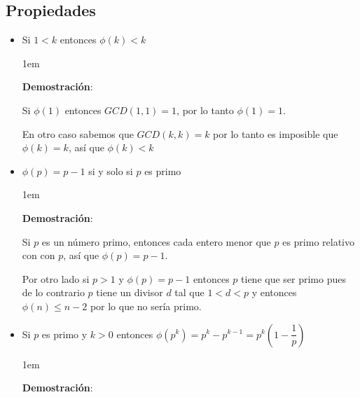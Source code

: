 \documentclass[12pt, fleqn]{report}                             %
\newenvironment{SmallIndentation}[1][0.75em]                    %
    {\begin{adjustwidth}{#1}{}\begin{footnotesize}}                 %
    {\end{footnotesize}\end{adjustwidth}}                           %
\newcommand{\Wrap}[1]{\left( #1 \right)}                        %
\begin{document}
        \subsection{Propiedades}

            \begin{itemize}

                \item Si $1 < k$ entonces $\phi(k) < k$
                
                    \begin{SmallIndentation}[1em]
                        \textbf{Demostración}:

                        Si $\phi(1)$ entonces $GCD(1,1) = 1$, por lo tanto
                        $\phi(1)=1$.

                        En otro caso sabemos que $GCD(k, k) = k$ por lo tanto
                        es imposible que $\phi(k)=k$, así que $\phi(k) < k$

                    \end{SmallIndentation}


                \item $\phi(p) = p - 1$ si y solo si $p$ es primo

                    \begin{SmallIndentation}[1em]
                        \textbf{Demostración}:

                        Si $p$ es un número primo, entonces cada entero menor
                        que $p$ es primo relativo con con $p$, así que 
                        $\phi(p) = p-1$.

                        Por otro lado si $p>1$ y $\phi(p) = p-1$ entonces $p$
                        tiene que ser primo pues de lo contrario $p$ tiene
                        un divisor $d$ tal que $1<d<p$ y entonces
                        $\phi(n) \leq n-2$ por lo que no sería primo.

                    \end{SmallIndentation}


                \item Si $p$ es primo y $k > 0$ entonces
                    $\phi(p^k) = p^k - p^{k-1} = p^k\Wrap{1 - \dfrac{1}{p}}$

                    \begin{SmallIndentation}[1em]
                        \textbf{Demostración}:


\end{SmallIndentation}
\end{itemize}
\end{document}
